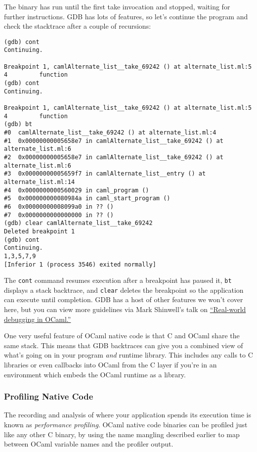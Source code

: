 The binary has run until the first take invocation and stopped, waiting
for further instructions. GDB has lots of features, so let's continue
the program and check the stacktrace after a couple of recursions:

\begin{lstlisting}
(gdb) cont
Continuing.

Breakpoint 1, camlAlternate_list__take_69242 () at alternate_list.ml:5
4         function
(gdb) cont
Continuing.

Breakpoint 1, camlAlternate_list__take_69242 () at alternate_list.ml:5
4         function
(gdb) bt
#0  camlAlternate_list__take_69242 () at alternate_list.ml:4
#1  0x00000000005658e7 in camlAlternate_list__take_69242 () at alternate_list.ml:6
#2  0x00000000005658e7 in camlAlternate_list__take_69242 () at alternate_list.ml:6
#3  0x00000000005659f7 in camlAlternate_list__entry () at alternate_list.ml:14
#4  0x0000000000560029 in caml_program ()
#5  0x000000000080984a in caml_start_program ()
#6  0x00000000008099a0 in ?? ()
#7  0x0000000000000000 in ?? ()
(gdb) clear camlAlternate_list__take_69242
Deleted breakpoint 1
(gdb) cont
Continuing.
1,3,5,7,9
[Inferior 1 (process 3546) exited normally]
\end{lstlisting}

The \passthrough{\lstinline!cont!} command resumes execution after a
breakpoint has paused it, \passthrough{\lstinline!bt!} displays a stack
backtrace, and \passthrough{\lstinline!clear!} deletes the breakpoint so
the application can execute until completion. GDB has a host of other
features we won't cover here, but you can view more guidelines via Mark
Shinwell's talk on
\href{http://www.youtube.com/watch?v=NF2WpWnB-nk\%3C}{``Real-world
debugging in OCaml.''}

One very useful feature of OCaml native code is that C and OCaml share
the same stack. This means that GDB backtraces can give you a combined
view of what's going on in your program \emph{and} runtime library. This
includes any calls to C libraries or even callbacks into OCaml from the
C layer if you're in an environment which embeds the OCaml runtime as a
library.

\hypertarget{profiling-native-code}{%
\subsubsection{Profiling Native Code}\label{profiling-native-code}}

The recording and analysis of where your application spends its
execution time is known as \emph{performance profiling}. OCaml native
code binaries can be profiled just like any other C binary, by using the
name mangling described earlier to map between OCaml variable names and
the profiler output.

